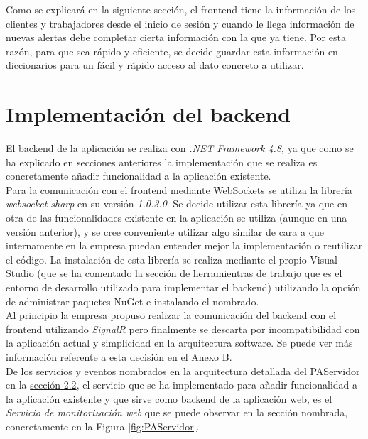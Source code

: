 Como se explicará en la siguiente sección, el frontend tiene la información de los clientes y trabajadores desde el inicio de sesión y cuando le llega información de nuevas alertas debe completar cierta información con la que ya tiene. Por esta razón, para que sea rápido y eficiente, se decide guardar esta información en diccionarios para un fácil y rápido acceso al dato concreto a utilizar. 

\newpage
\section{Implementación del backend}

El backend de la aplicación se realiza con \textit{.NET Framework 4.8}, ya que como se ha explicado en secciones anteriores la implementación que se realiza es concretamente añadir funcionalidad a la aplicación existente. \\

Para la comunicación con el frontend mediante WebSockets se utiliza la librería \textit{websocket-sharp} \cite{websocket-sharp} en su versión \textit{1.0.3.0}.
Se decide utilizar esta librería ya que en otra de las funcionalidades existente en la aplicación se utiliza (aunque en una versión anterior), y se cree conveniente utilizar algo similar de cara a que internamente en la empresa puedan entender mejor la implementación o reutilizar el código.
La instalación de esta librería se realiza mediante el propio Visual Studio (que se ha comentado la sección de herramientras de trabajo que es el entorno de desarrollo utilizado para implementar el backend) utilizando la opción de administrar paquetes NuGet e instalando el nombrado. \\

Al principio la empresa propuso realizar la comunicación del backend con el frontend utilizando \textit{SignalR} \cite{signalr} pero finalmente se descarta por incompatibilidad con la aplicación actual y simplicidad en la arquitectura software. Se puede ver más información referente a esta decisión en el \hyperref[anexo-b]{Anexo B}. \\


De los servicios y eventos nombrados en la arquitectura detallada del PAServidor en la \hyperref[section-arquitectura]{sección 2.2}, el servicio que se ha implementado para añadir funcionalidad a la aplicación existente y que sirve como backend de la aplicación web, es el \textit{Servicio de monitorización web} que se puede observar en la sección nombrada, concretamente en la Figura \ref{fig:PAServidor}.\\

